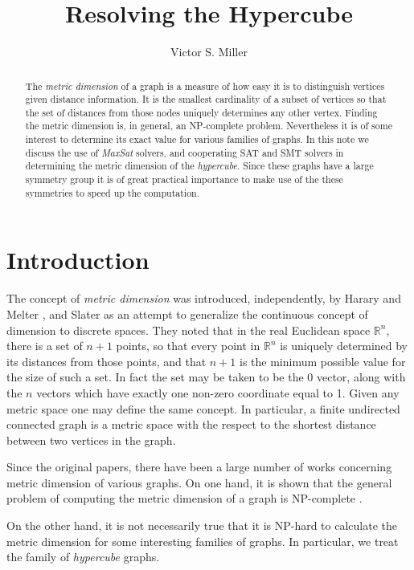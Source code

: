 \documentclass{article}
\title{Resolving the Hypercube} \author{Victor S. Miller}
\newcommand{\RR}{\mathbb{R}}
\begin{document}
\maketitle
\begin{abstract}
  The \emph{metric dimension} of a graph is a measure of how easy it
  is to distinguish vertices given distance information.  It is the
  smallest cardinality of a subset of vertices so that the set of
  distances from those nodes uniquely determines any other vertex.
  Finding the metric dimension is, in general, an NP-complete problem.
  Nevertheless it is of some interest to determine its exact value for
  various families of graphs.  In this note we discuss the use of
  \emph{MaxSat} solvers, and cooperating SAT and SMT solvers in
  determining the metric dimension of the \emph{hypercube}.  Since
  these graphs have a large symmetry group it is of great practical
  importance to make use of the these symmetries to speed up the
  computation.
\end{abstract}

\section{Introduction}
\label{sec:intro}

The concept of \emph{metric dimension} was introduced, independently,
by Harary and Melter \cite{harary1976metric}, and Slater
\cite{slater1975leaves} as an attempt to generalize the continuous
concept of dimension to discrete spaces.  They noted that in the real
Euclidean space $\RR^n$, there is a set of $n+1$ points, so that
every point in $\RR^n$ is uniquely determined by its distances from
those points, and that $n+1$ is the minimum possible value for the
size of such a set.  In fact the set may be taken to be the 0 vector,
along with the $n$ vectors which have exactly one non-zero coordinate
equal to 1.  Given any metric space one may define the same concept.
In particular, a finite undirected connected graph is a metric space
with the respect to the shortest distance between two vertices in the
graph.

Since the original papers, there have been a large number of works
concerning metric dimension of various graphs.  On one hand, it is
shown that the general problem of computing the metric dimension of a
graph is NP-complete
\cite[GT61]{garey1979computers,khuller1996landmarks,diaz2012complexity,hauptmann2012approximation}.

On the other hand, it is not necessarily true that it is NP-hard to
calculate the metric dimension for some interesting
families of graphs.  In particular, we treat the family of
\emph{hypercube} graphs.
\end{document}
